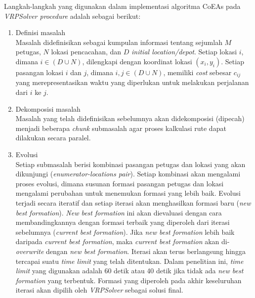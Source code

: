 Langkah-langkah yang digunakan dalam implementasi algoritma CoEAs pada \textit{VRPSolver procedure} adalah sebagai berikut:
\begin{enumerate}
\item Definisi masalah \\
Masalah didefinisikan sebagai kumpulan informasi tentang sejumlah $M$ petugas, $N$ lokasi pencacahan, dan $D$ \textit{initial location/depot}. Setiap lokasi $i$, dimana $i \in (D \cup N)$, dilengkapi dengan koordinat lokasi $(x_i, y_i)$. Setiap pasangan lokasi $i$ dan $j$, dimana $i, j \in (D \cup N)$, memiliki \textit{cost} sebesar $c_{ij}$ yang merepresentasikan waktu yang diperlukan untuk melakukan perjalanan dari $i$ ke $j$. 

\item Dekomposisi masalah \\
Masalah yang telah didefinisikan sebelumnya akan didekomposisi (dipecah) menjadi beberapa \textit{chunk} submasalah agar proses kalkulasi rute dapat dilakukan secara paralel. 

\item Evolusi \\
Setiap submasalah berisi kombinasi pasangan petugas dan lokasi yang akan dikunjungi (\textit{enumerator-locations pair}). Setiap kombinasi akan mengalami proses evolusi, dimana susunan formasi pasangan petugas dan lokasi mengalami perubahan untuk menemukan formasi yang lebih baik. Evolusi terjadi secara iteratif dan setiap iterasi akan menghasilkan formasi baru (\textit{new best formation}). \textit{New best formation} ini akan dievaluasi dengan cara membandingkannya dengan formasi terbaik yang diperoleh dari iterasi sebelumnya (\textit{current best formation}). Jika \textit{new best formation} lebih baik daripada \textit{current best formation}, maka \textit{current best formation} akan di-\textit{overwrite} dengan \textit{new best formation}. Iterasi akan terus berlangsung hingga tercapai suatu \textit{time limit} yang telah ditentukan. Dalam penelitian ini, \textit{time limit} yang digunakan adalah 60 detik atau 40 detik jika tidak ada \textit{new best formation} yang terbentuk. Formasi yang diperoleh pada akhir keseluruhan iterasi akan dipilih oleh \textit{VRPSolver} sebagai solusi final. 
\end{enumerate}


